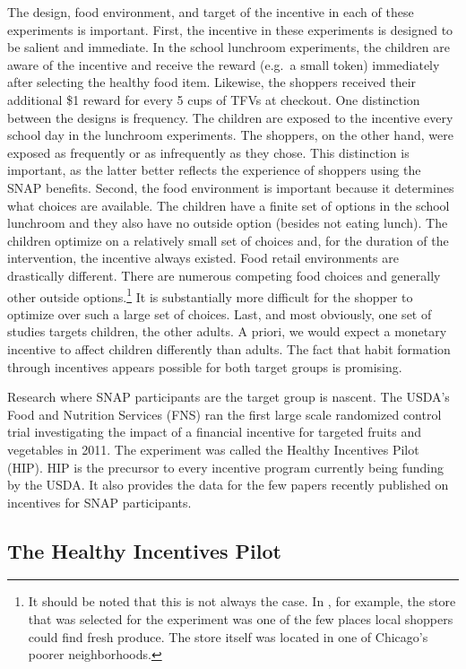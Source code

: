 \documentclass[12pt,letterpaperpaper,]{book}
\begin{document}
The design, food environment, and target of the incentive in each of
these experiments is important. First, the incentive in these
experiments is designed to be salient and immediate. In the school
lunchroom experiments, the children are aware of the incentive and
receive the reward (e.g.~a small token) immediately after selecting the
healthy food item. Likewise, the shoppers received their additional \$1
reward for every 5 cups of TFVs at checkout. One distinction between the
designs is frequency. The children are exposed to the incentive every
school day in the lunchroom experiments. The shoppers, on the other
hand, were exposed as frequently or as infrequently as they chose. This
distinction is important, as the latter better reflects the experience
of shoppers using the SNAP benefits. Second, the food environment is
important because it determines what choices are available. The children
have a finite set of options in the school lunchroom and they also have
no outside option (besides not eating lunch). The children optimize on a
relatively small set of choices and, for the duration of the
intervention, the incentive always existed. Food retail environments are
drastically different. There are numerous competing food choices and
generally other outside options.\footnote{It should be noted that this
  is not always the case. In \citet{list_incentives_2015}, for example,
  the store that was selected for the experiment was one of the few
  places local shoppers could find fresh produce. The store itself was
  located in one of Chicago's poorer neighborhoods.} It is substantially
more difficult for the shopper to optimize over such a large set of
choices. Last, and most obviously, one set of studies targets children,
the other adults. A priori, we would expect a monetary incentive to
affect children differently than adults. The fact that habit formation
through incentives appears possible for both target groups is promising.

Research where SNAP participants are the target group is nascent. The
USDA's Food and Nutrition Services (FNS) ran the first large scale
randomized control trial investigating the impact of a financial
incentive for targeted fruits and vegetables in 2011. The experiment was
called the Healthy Incentives Pilot (HIP). HIP is the precursor to every
incentive program currently being funding by the USDA. It also provides
the data for the few papers recently published on incentives for SNAP
participants.

\subsection*{The Healthy Incentives
Pilot}\label{the-healthy-incentives-pilot}
\end{document}
